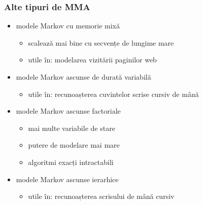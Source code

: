 \begin{frame}
  \frametitle{Alte tipuri de MMA}
  \begin{itemize}
  \item modele Markov cu memorie mixă \citep{Saul:1999:MMM:326214.325611}
    \begin{itemize}
    \item scalează mai bine cu secvențe de lungime mare
    \item utile în: modelarea vizitării paginilor web
    \end{itemize}
    \vspace*{.5em}
  \item modele Markov ascunse de durată variabilă \citep{rabiner1989tutorial}
    \begin{itemize}
    \item utile în: recunoașterea cuvintelor scrise cursiv de mână \citep{chen1995variable}
    \end{itemize}
    \vspace*{.5em}
  \item modele Markov ascunse factoriale \citep{Ghahramani97factorialhidden}
    \begin{itemize}
    \item mai multe variabile de stare
    \item putere de modelare mai mare
    \item algoritmi exacți intractabili
    \end{itemize}
    \vspace*{.5em}
  \item modele Markov ascunse ierarhice \citep{fine1998hierarchical}
    \begin{itemize}
    \item utile în: recunoașterea scrisului de mână cursiv
    \end{itemize}
  \end{itemize}
\end{frame}